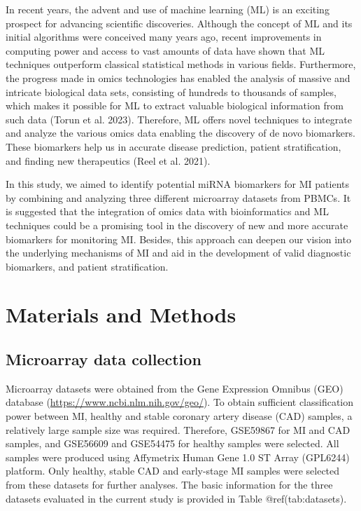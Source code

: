 \documentclass[smallextended]{svjour3}       %
\begin{document}
In recent years, the advent and use of machine learning (ML) is an
exciting prospect for advancing scientific discoveries. Although the
concept of ML and its initial algorithms were conceived many years ago,
recent improvements in computing power and access to vast amounts of
data have shown that ML techniques outperform classical statistical
methods in various fields. Furthermore, the progress made in omics
technologies has enabled the analysis of massive and intricate
biological data sets, consisting of hundreds to thousands of samples,
which makes it possible for ML to extract valuable biological
information from such data (Torun et al. 2023). Therefore, ML offers
novel techniques to integrate and analyze the various omics data
enabling the discovery of de novo biomarkers. These biomarkers help us
in accurate disease prediction, patient stratification, and finding new
therapeutics (Reel et al. 2021).

In this study, we aimed to identify potential miRNA biomarkers for MI
patients by combining and analyzing three different microarray datasets
from PBMCs. It is suggested that the integration of omics data with
bioinformatics and ML techniques could be a promising tool in the
discovery of new and more accurate biomarkers for monitoring MI.
Besides, this approach can deepen our vision into the underlying
mechanisms of MI and aid in the development of valid diagnostic
biomarkers, and patient stratification.

\hypertarget{materials-and-methods}{%
\section{Materials and Methods}\label{materials-and-methods}}

\hypertarget{microarray-data-collection}{%
\subsection{Microarray data
collection}\label{microarray-data-collection}}

Microarray datasets were obtained from the Gene Expression Omnibus (GEO)
database (\url{https://www.ncbi.nlm.nih.gov/geo/}). To obtain sufficient
classification power between MI, healthy and stable coronary artery
disease (CAD) samples, a relatively large sample size was required.
Therefore, GSE59867 for MI and CAD samples, and GSE56609 and GSE54475
for healthy samples were selected. All samples were produced using
Affymetrix Human Gene 1.0 ST Array (GPL6244) platform. Only healthy,
stable CAD and early-stage MI samples were selected from these datasets
for further analyses. The basic information for the three datasets
evaluated in the current study is provided in Table @ref(tab:datasets).
\end{document}
